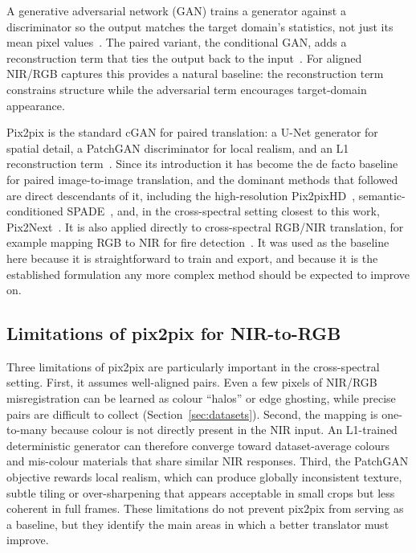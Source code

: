 A generative adversarial network (GAN) trains a generator against a discriminator so the output matches the target domain's statistics, not just its mean pixel values~\cite{goodfellow2014generative}. The paired variant, the conditional GAN, adds a reconstruction term that ties the output back to the input~\cite{isola2017image}. For aligned NIR/RGB captures this provides a natural baseline: the reconstruction term constrains structure while the adversarial term encourages target-domain appearance.

Pix2pix is the standard cGAN for paired translation: a U-Net generator for spatial detail, a PatchGAN discriminator for local realism, and an L1 reconstruction term~\cite{isola2017image}. Since its introduction it has become the de facto baseline for paired image-to-image translation, and the dominant methods that followed are direct descendants of it, including the high-resolution Pix2pixHD~\cite{wang2018pix2pixhd}, semantic-conditioned SPADE~\cite{park2019spade}, and, in the cross-spectral setting closest to this work, Pix2Next~\cite{pix2next2024}. It is also applied directly to cross-spectral RGB/NIR translation, for example mapping RGB to NIR for fire detection~\cite{akagic2023rgbnir}. It was used as the baseline here because it is straightforward to train and export, and because it is the established formulation any more complex method should be expected to improve on.

\subsection{Limitations of pix2pix for NIR-to-RGB}
\label{sec:pix2pix_limitations}

Three limitations of pix2pix are particularly important in the cross-spectral setting. First, it assumes well-aligned pairs. Even a few pixels of NIR/RGB misregistration can be learned as colour ``halos'' or edge ghosting, while precise pairs are difficult to collect (Section~\ref{sec:datasets}). Second, the mapping is one-to-many because colour is not directly present in the NIR input. An L1-trained deterministic generator can therefore converge toward dataset-average colours and mis-colour materials that share similar NIR responses. Third, the PatchGAN objective rewards local realism, which can produce globally inconsistent texture, subtle tiling or over-sharpening that appears acceptable in small crops but less coherent in full frames. These limitations do not prevent pix2pix from serving as a baseline, but they identify the main areas in which a better translator must improve.

